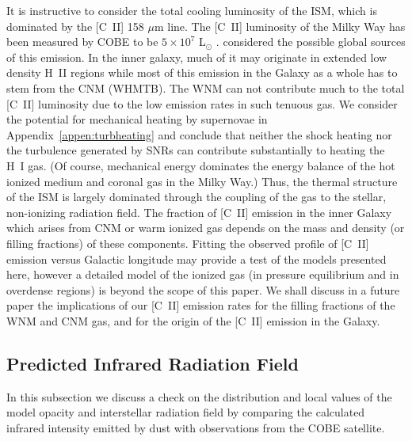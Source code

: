 \documentclass[12pt,preprint,flushrt]{aastex}
\begin{document}
It is instructive to consider the total cooling luminosity of
the ISM, which is dominated by the [C~II] 158 $\mu$m line.  The [C~II]
luminosity of the Milky Way has been measured by COBE to be $5\times
10^7$ L$_{\odot}$ \citep{wright91}.  \cite{tie95}  considered  the 
possible global sources of this emission. In the inner galaxy, much of 
it may originate in extended low density H~II regions \citep{hei94} while
most of this emission in the Galaxy as a whole has to stem from the
CNM (WHMTB).  The WNM can not contribute much to the total [C~II] 
luminosity due to the low emission rates in such tenuous gas. 
We consider the potential for mechanical heating 
by supernovae in Appendix~\ref{appen:turbheating} and conclude 
that neither the shock
heating nor the turbulence generated by SNRs can contribute
substantially to heating the H~I gas. (Of course, mechanical energy dominates
the energy balance of the hot ionized medium and coronal gas in the
Milky Way.)  Thus, the thermal structure of the ISM
is largely dominated through the coupling of the gas to the 
stellar, non-ionizing radiation field. The fraction of [C~II] emission
in the inner Galaxy which arises from CNM or warm ionized gas depends 
on the mass and density (or filling fractions) of these components.
Fitting the observed profile of [C~II] emission versus Galactic
longitude may provide a test of the models presented here, however  
a detailed model of the ionized gas (in pressure equilibrium and 
in overdense regions) is beyond the scope of this
paper.   We shall discuss in a future paper the implications of 
our [C~II] emission
rates for the filling fractions of the WNM and CNM gas, and for the origin
of the [C~II] emission in the Galaxy.


\subsection{Predicted Infrared Radiation Field}\label{sub:IRcheck}

In this subsection we discuss a check on the distribution and local values
of the model opacity and interstellar radiation field by comparing
the calculated infrared intensity emitted by dust with observations
from the COBE satellite.
\end{document}

